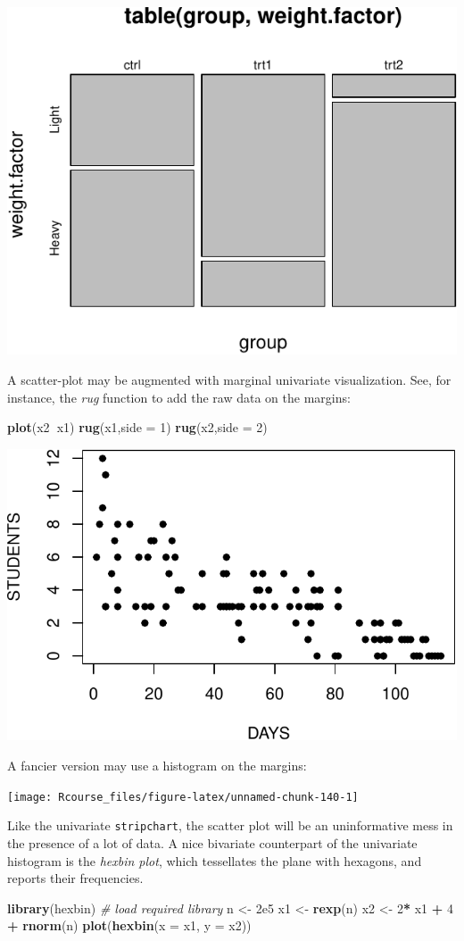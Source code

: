 \documentclass[]{book}
\newenvironment{Shaded}{\begin{snugshade}}{\end{snugshade}}
\newcommand{\CommentTok}[1]{\textcolor[rgb]{0.56,0.35,0.01}{\textit{#1}}}
\newcommand{\DataTypeTok}[1]{\textcolor[rgb]{0.13,0.29,0.53}{#1}}
\newcommand{\DecValTok}[1]{\textcolor[rgb]{0.00,0.00,0.81}{#1}}
\newcommand{\FloatTok}[1]{\textcolor[rgb]{0.00,0.00,0.81}{#1}}
\newcommand{\KeywordTok}[1]{\textcolor[rgb]{0.13,0.29,0.53}{\textbf{#1}}}
\newcommand{\NormalTok}[1]{#1}
\newcommand{\OperatorTok}[1]{\textcolor[rgb]{0.81,0.36,0.00}{\textbf{#1}}}
\newcommand{\StringTok}[1]{\textcolor[rgb]{0.31,0.60,0.02}{#1}}
\theoremstyle{definition}
\theoremstyle{definition}
\theoremstyle{definition}
\theoremstyle{remark}
\begin{document}
\includegraphics[width=0.5\linewidth]{Rcourse_files/figure-latex/unnamed-chunk-138-1}

A scatter-plot may be augmented with marginal univariate visualization.
See, for instance, the \emph{rug} function to add the raw data on the margins:

\begin{Shaded}
\begin{Highlighting}[]
\KeywordTok{plot}\NormalTok{(x2}\OperatorTok{~}\NormalTok{x1)}
\KeywordTok{rug}\NormalTok{(x1,}\DataTypeTok{side =} \DecValTok{1}\NormalTok{)}
\KeywordTok{rug}\NormalTok{(x2,}\DataTypeTok{side =} \DecValTok{2}\NormalTok{)}
\end{Highlighting}
\end{Shaded}

\includegraphics[width=0.5\linewidth]{Rcourse_files/figure-latex/unnamed-chunk-139-1}

A fancier version may use a histogram on the margins:

\texttt{[image: Rcourse\_files/figure-latex/unnamed-chunk-140-1]}

Like the univariate \texttt{stripchart}, the scatter plot will be an uninformative mess in the presence of a lot of data.
A nice bivariate counterpart of the univariate histogram is the \emph{hexbin plot}, which tessellates the plane with hexagons, and reports their frequencies.

\begin{Shaded}
\begin{Highlighting}[]
\KeywordTok{library}\NormalTok{(hexbin) }\CommentTok{# load required library}
\NormalTok{n <-}\StringTok{ }\FloatTok{2e5}
\NormalTok{x1 <-}\StringTok{ }\KeywordTok{rexp}\NormalTok{(n)}
\NormalTok{x2 <-}\StringTok{ }\DecValTok{2}\OperatorTok{*}\StringTok{ }\NormalTok{x1 }\OperatorTok{+}\StringTok{ }\DecValTok{4} \OperatorTok{+}\StringTok{ }\KeywordTok{rnorm}\NormalTok{(n)}
\KeywordTok{plot}\NormalTok{(}\KeywordTok{hexbin}\NormalTok{(}\DataTypeTok{x =}\NormalTok{ x1, }\DataTypeTok{y =}\NormalTok{ x2))}
\end{Highlighting}
\end{Shaded}
\end{document}

